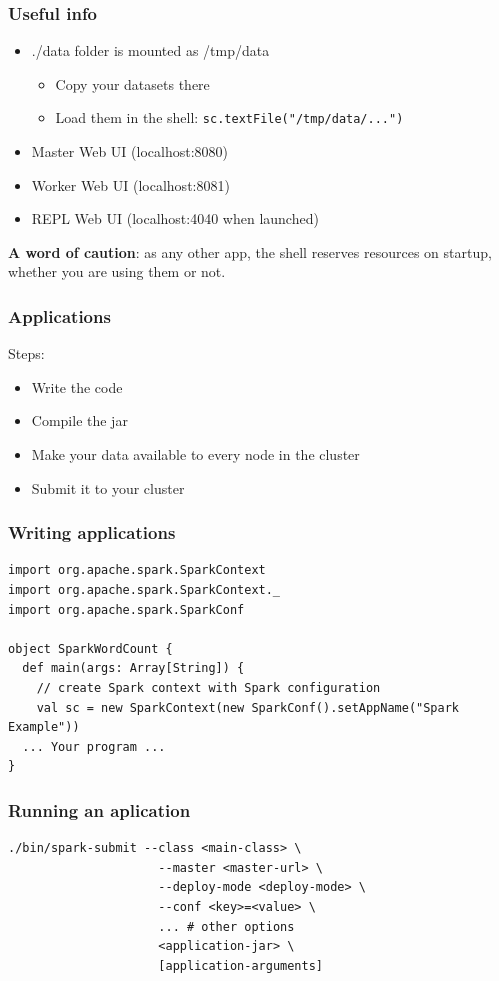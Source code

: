 \documentclass{beamer}
\begin{document}
\begin{frame}[fragile]
  \frametitle{Useful info}
  \begin{itemize}
  \item ./data folder is mounted as /tmp/data
    \begin{itemize}
    \item Copy your datasets there
    \item Load them in the shell: \texttt{sc.textFile("/tmp/data/...")}
    \end{itemize}
  \item Master Web UI (localhost:8080)
  \item Worker Web UI (localhost:8081)
  \item REPL Web UI (localhost:4040 when launched)
    \end{itemize}
\textbf{A word of caution}: as any other app, the shell reserves resources on startup, whether you are using them or not.
\end{frame}

\begin{frame}[fragile]
  \frametitle{Applications}
  Steps:
  \begin{itemize}
    \item Write the code
    \item Compile the jar
    \item Make your data available to every node in the cluster
    \item Submit it to your cluster 
  \end{itemize}
\end{frame}
\begin{frame}[fragile]
  \frametitle{Writing applications}
    \begin{lstlisting}[title=Example application,basicstyle=\ttfamily]
import org.apache.spark.SparkContext
import org.apache.spark.SparkContext._
import org.apache.spark.SparkConf

object SparkWordCount {
  def main(args: Array[String]) {
    // create Spark context with Spark configuration
    val sc = new SparkContext(new SparkConf().setAppName("Spark Example"))
  ... Your program ...
}
\end{lstlisting}
\end{frame}

\begin{frame}[fragile]
  \frametitle{Running an aplication}
    \begin{lstlisting}[language={},numbers=none]
./bin/spark-submit --class <main-class> \
                     --master <master-url> \
                     --deploy-mode <deploy-mode> \
                     --conf <key>=<value> \
                     ... # other options
                     <application-jar> \
                     [application-arguments]
\end{lstlisting}
\end{frame}
\end{document}
